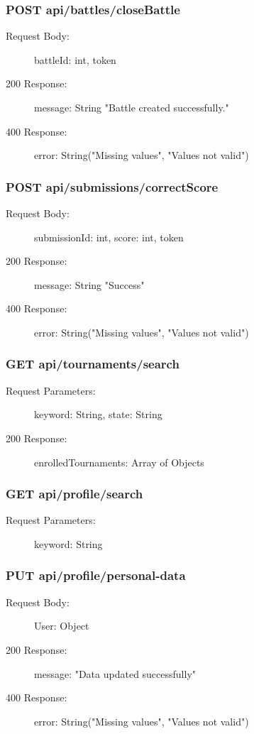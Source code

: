 \documentclass{Configuration_Files/Template}
\begin{document}
\subsubsection{POST api/battles/closeBattle}
\begin{description}
    \item[Request Body:] battleId: int, token
    \item[200 Response:] message: String "Battle created successfully."
    \item[400 Response:] error: String("Missing values", "Values not valid")
\end{description}

\subsubsection{POST api/submissions/correctScore}
\begin{description}
    \item[Request Body:] submissionId: int, score: int, token
    \item[200 Response:] message: String "Success"
    \item[400 Response:] error: String("Missing values", "Values not valid")
\end{description}


\subsubsection{GET api/tournaments/search}
\begin{description}
    \item[Request Parameters:] keyword: String, state: String
    \item[200 Response:] enrolledTournaments: Array of Objects
\end{description}

\subsubsection{GET api/profile/search}
\begin{description}
    \item[Request Parameters:] keyword: String
\end{description}

\subsubsection{PUT api/profile/personal-data}
\begin{description}
    \item[Request Body:] User: Object
    \item[200 Response:] message: "Data updated successfully"
    \item[400 Response:] error: String("Missing values", "Values not valid")
\end{description}
\end{document}
